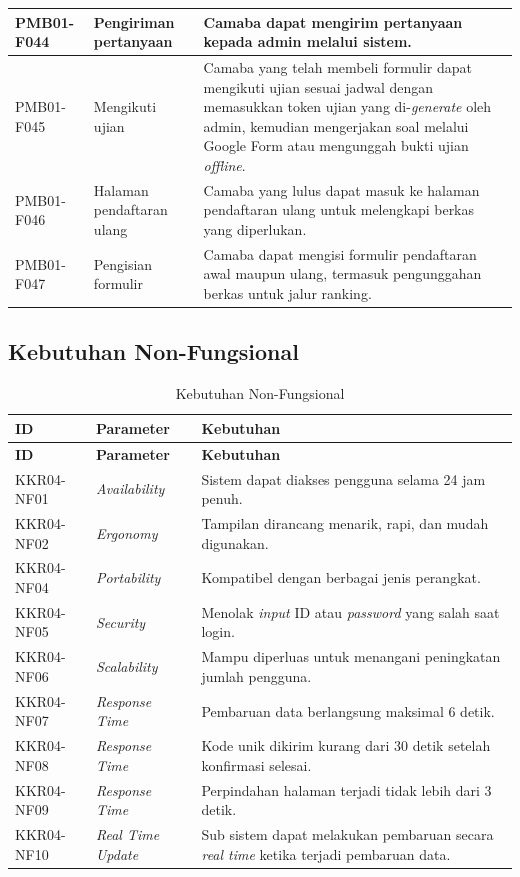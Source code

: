 \begin{longtable}{|p{}|p{}|p{}|}
	\hline
	PMB01-F044 & Pengiriman pertanyaan & Camaba dapat mengirim pertanyaan kepada admin melalui sistem. \\
	\hline
	PMB01-F045 & Mengikuti ujian & Camaba yang telah membeli formulir dapat mengikuti ujian sesuai jadwal dengan memasukkan token ujian yang di-\textit{generate} oleh admin, kemudian mengerjakan soal melalui Google Form atau mengunggah bukti ujian \textit{offline}. \\
	\hline
	PMB01-F046 & Halaman pendaftaran ulang & Camaba yang lulus dapat masuk ke halaman pendaftaran ulang untuk melengkapi berkas yang diperlukan. \\
	\hline
	PMB01-F047 & Pengisian formulir & Camaba dapat mengisi formulir pendaftaran awal maupun ulang, termasuk pengunggahan berkas untuk jalur ranking. \\
	\hline
\end{longtable}

\subsection{Kebutuhan Non-Fungsional} \label{III.KebutuhanNonFungsional}

\begin{longtable}{|p{}|p{}|p{}|}
	\caption{Kebutuhan Non-Fungsional}
	\label{table:3.kebutuhannonfungsional}\\
	\hline
	\textbf{ID} & \textbf{Parameter} & \textbf{Kebutuhan} \\
	\hline
	\endfirsthead
	\hline
	\textbf{ID} & \textbf{Parameter} & \textbf{Kebutuhan} \\
	\hline
	\endhead
	KKR04-NF01 & \textit{Availability} & Sistem dapat diakses pengguna selama 24 jam penuh. \\
	\hline
	KKR04-NF02 & \textit{Ergonomy} & Tampilan dirancang menarik, rapi, dan mudah digunakan. \\
	\hline
	KKR04-NF04 & \textit{Portability} & Kompatibel dengan berbagai jenis perangkat. \\
	\hline
	KKR04-NF05 & \textit{Security} & Menolak \textit{input} ID atau \textit{password} yang salah saat login. \\
	\hline
	KKR04-NF06 & \textit{Scalability} & Mampu diperluas untuk menangani peningkatan jumlah pengguna. \\
	\hline
	KKR04-NF07 & \textit{Response Time} & Pembaruan data berlangsung maksimal 6 detik. \\
	\hline
	KKR04-NF08 & \textit{Response Time} & Kode unik dikirim kurang dari 30 detik setelah konfirmasi selesai. \\
	\hline
	KKR04-NF09 & \textit{Response Time} & Perpindahan halaman terjadi tidak lebih dari 3 detik. \\
	\hline
	KKR04-NF10 & \textit{Real Time Update} & Sub sistem dapat melakukan pembaruan secara \textit{real time} ketika terjadi pembaruan data. \\
	\hline
\end{longtable}


